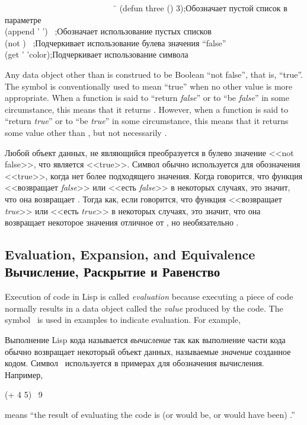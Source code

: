 \begin{lisp}
~~~~~~~~~~~~~~~~~~~~~~~~~~~\=\kill
(defun three () 3)\>;{\rm Обозначает пустой список в параметре} \\
(append '{\emptylist} '{\emptylist}) \EV\ {\emptylist}\>;{\rm Обозначает использование
пустых списков} \\
(not {\false}) \EV\ {\true}\>;{\rm Подчеркивает использование булева значения ``false''} \\
(get '{\nil} 'color)\>;{\rm Подчеркивает использование символа}
\end{lisp}

Any data object other than {\false} is construed to be Boolean
``not false'', that is, ``true''.  The symbol {\true} is conventionally
used to mean ``true'' when no other value is more appropriate.
When a function is said to ``return {\it false}'' or to ``be {\it false}''
in some circumstance, this means that it returns {\false}.
However, when a function is said to ``return {\it true}'' or to ``be {\it true}''
in some circumstance, this means that it returns some value other
than {\false}, but not necessarily {\true}.

Любой объект данных, не являющийся {\false} преобразуется в булево значение
<<not false>>, что является <<true>>. Символ {\true} обычно используется для
обозначения <<true>>, когда нет более подходящего значения.
Когда говорится, что функция <<возвращает {\it false}>> или <<есть {\it false}>>
в некоторых случаях, это значит, что она возвращает {\false}.
Тогда как, если говорится, что функция <<возвращает {\it true}>> или <<есть {\it
true}>> в некоторых случаях, это значит, что она возвращает некоторое
значения отличное от {\false}, но необязательно {\true}.

\subsection{Evaluation, Expansion, and Equivalence Вычисление, Раскрытие и Равенство}

Execution of code in Lisp is called {\it evaluation} because executing a
piece of code normally results in a data object called the {\it value}
produced by the code.  The symbol \EV\ is used in examples to
indicate evaluation.
For example,

Выполнение Lisp кода называется {\it вычисление} так как выполнение части кода
обычно возвращает некоторый объект данных, называемые {\it значение} созданное
кодом. Символ \EV\ используется в примерах для обозначения вычисления.
Например,
\begin{lisp}
(+ 4 5) \EV\ 9
\end{lisp}
means ``the result of evaluating the code  is (or would be,
or would have been) .'' 

